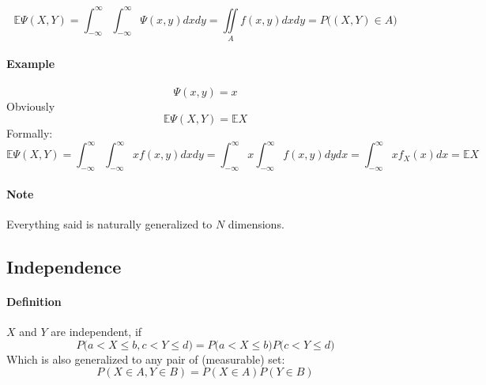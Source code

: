 $$\mathbb{E} \Psi(X,Y) = \int_{-\infty}^\infty\int_{-\infty}^\infty \Psi(x,y) dxdy = \iint\limits_{A} f(x,y) dx dy = P\big((X,Y) \in A\big)$$
\paragraph{Example}
$$\Psi(x,y) = x$$
Obviously
$$\mathbb{E} \Psi(X,Y) = \mathbb{E} X$$
Formally:
$$\mathbb{E} \Psi(X,Y) = \int_{-\infty}^\infty\int_{-\infty}^\infty x f(x,y) dx dy = \int_{-\infty}^\infty x \int_{-\infty}^\infty  f(x,y)  dy dx = \int_{-\infty}^\infty xf_X(x) dx = \mathbb{E}X$$

\paragraph{Note} Everything said is naturally generalized to $N$ dimensions.
\subsection{Independence}
\paragraph{Definition}
$X$ and $Y$ are independent, if
$$P\big( a < X \leq b, c < Y \leq d \big) = P\big( a < X \leq b\big) P\big(c < Y \leq d \big)$$
Which is also generalized to any pair of (measurable)  set:
$$P(X \in A, Y \in B) = P(X \in A)P(Y \in B)$$

